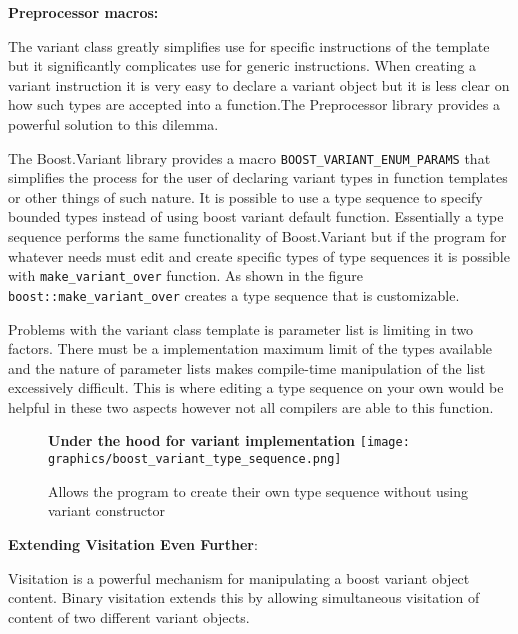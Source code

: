 \documentclass[letterpaper, 12pt]{article}
\newcommand{\inlinecode}[1]{\colorbox{codegrey}{\lstinline[language=C++]{#1}}}
\begin{document}
{\bfseries Preprocessor macros:}

\par\vspace{\baselineskip}
The variant class greatly simplifies use for specific instructions of the template but it
significantly complicates use for generic instructions. When creating a variant instruction
it is very easy to declare a variant object but it is less clear on how such types are
accepted into a function.The Preprocessor library provides a powerful solution to this dilemma.

\newpage
The Boost.Variant library provides a macro \inlinecode{BOOST_VARIANT_ENUM_PARAMS} that
simplifies the process for the user of declaring variant types in function templates or
other things of such nature. It is possible to use a type sequence to specify bounded types
instead of using boost variant default function. Essentially a type sequence performs the
same functionality of Boost.Variant but if the program for whatever needs must edit and
create specific types of type sequences it is possible with \inlinecode{make_variant_over}
function. As shown in the figure \inlinecode{boost::make_variant_over} creates a type sequence that
is customizable.

\par\vspace{\baselineskip}
Problems with the variant class template is parameter list is limiting in
two factors. There must be a implementation maximum limit of the types available and the
nature of parameter lists makes compile-time manipulation of the list excessively difficult.
This is where editing a type sequence on your own would be helpful in these two aspects
however not all compilers are able to this function.
\par\vspace{\baselineskip}

\begin{figure}
  \centering
  \textbf{Under the hood for variant implementation}
  \texttt{[image: graphics/boost\_variant\_type\_sequence.png]}
  \cite{boostvariant}
  \caption{Allows the program to create their own type sequence without using variant constructor}
\end{figure}

{\bfseries Extending Visitation Even Further}:
\par\vspace{\baselineskip}
Visitation is a powerful mechanism for manipulating a boost variant object content. Binary visitation
extends this by allowing simultaneous visitation of content of two different variant objects.
\par\vspace{\baselineskip}
\end{document}
